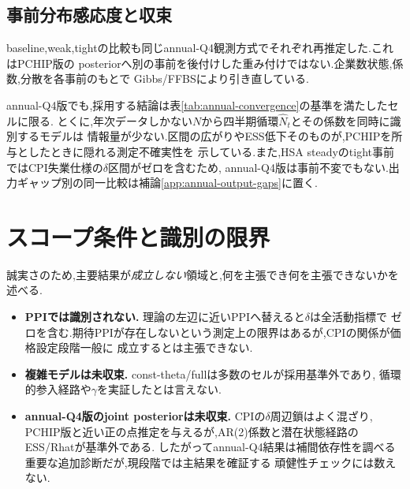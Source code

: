 \documentclass[11pt]{article}
\begin{document}
\subsection{事前分布感応度と収束}
baseline,weak,tightの比較も同じannual-Q4観測方式でそれぞれ再推定した.これはPCHIP版の
posteriorへ別の事前を後付けした重み付けではない.企業数状態,係数,分散を各事前のもとで
Gibbs/FFBSにより引き直している.

\begin{table}[H]
\centering
\caption{annual-Q4版:失業ギャップ仕様の全モデル・三事前感応度.$\dagger$は収束基準外.}
\label{tab:annual-priors}
\tiny
\resizebox{\linewidth}{!}{}
\end{table}

\begin{table}[H]
\centering
\caption{annual-Q4比較表のモデル別収束集計.CES 16セルは共通参照,HSA 61セルは新規推定.}
\label{tab:annual-convergence}
\small

\end{table}

annual-Q4版でも,採用する結論は表\ref{tab:annual-convergence}の基準を満たしたセルに限る.
とくに,年次データしかない$N$から四半期循環$\hat N_t$とその係数を同時に識別するモデルは
情報量が少ない.区間の広がりやESS低下そのものが,PCHIPを所与としたときに隠れる測定不確実性を
示している.また,HSA steadyのtight事前ではCPI失業仕様の$\delta$区間がゼロを含むため,
annual-Q4版は事前不変でもない.出力ギャップ別の同一比較は補論\ref{app:annual-output-gaps}に置く.

\section{スコープ条件と識別の限界}
\label{sec:scope}
誠実さのため,主要結果が\emph{成立しない}領域と,何を主張でき何を主張できないかを述べる.
\begin{itemize}
\item \textbf{PPIでは識別されない.} 理論の左辺に近いPPIへ替えると$\delta$は全活動指標で
ゼロを含む.期待PPIが存在しないという測定上の限界はあるが,CPIの関係が価格設定段階一般に
成立するとは主張できない.
\item \textbf{複雑モデルは未収束.} const-theta/fullは多数のセルが採用基準外であり,
循環的参入経路や$\gamma$を実証したとは言えない.
\item \textbf{annual-Q4版のjoint posteriorは未収束.} CPIの$\delta$周辺鎖はよく混ざり,
PCHIP版と近い正の点推定を与えるが,AR(2)係数と潜在状態経路のESS/Rhatが基準外である.
したがってannual-Q4結果は補間依存性を調べる重要な追加診断だが,現段階では主結果を確証する
頑健性チェックには数えない.
\end{itemize}
\end{document}
